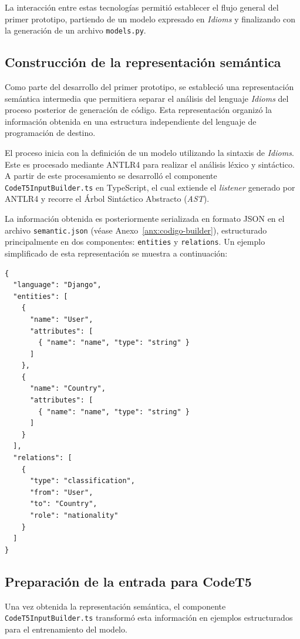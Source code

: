 La interacción entre estas tecnologías permitió establecer el flujo general del primer prototipo, partiendo de un modelo expresado en \textit{Idioms} y finalizando con la generación de un archivo \texttt{models.py}.

\subsection{Construcción de la representación semántica}
\label{subsec:p1-representacion-semantica}

Como parte del desarrollo del primer prototipo, se estableció una representación semántica intermedia que permitiera separar el análisis del lenguaje \textit{Idioms} del proceso posterior de generación de código. Esta representación organizó la información obtenida en una estructura independiente del lenguaje de programación de destino.

El proceso inicia con la definición de un modelo utilizando la sintaxis de \textit{Idioms}. Este es procesado mediante ANTLR4 para realizar el análisis léxico y sintáctico. A partir de este procesamiento se desarrolló el componente \texttt{CodeT5InputBuilder.ts} en TypeScript, el cual extiende el \textit{listener} generado por ANTLR4 y recorre el Árbol Sintáctico Abstracto (\textit{AST}).

La información obtenida es posteriormente serializada en formato JSON en el archivo \texttt{semantic.json} (véase Anexo~\ref{anx:codigo-builder}), estructurado principalmente en dos componentes: \texttt{entities} y \texttt{relations}. Un ejemplo simplificado de esta representación se muestra a continuación:

\begin{verbatim}
{
  "language": "Django",
  "entities": [
    {
      "name": "User",
      "attributes": [
        { "name": "name", "type": "string" }
      ]
    },
    {
      "name": "Country",
      "attributes": [
        { "name": "name", "type": "string" }
      ]
    }
  ],
  "relations": [
    {
      "type": "classification",
      "from": "User",
      "to": "Country",
      "role": "nationality"
    }
  ]
}
\end{verbatim}

\subsection{Preparación de la entrada para CodeT5}
\label{subsec:p1-preparacion-entrada}

Una vez obtenida la representación semántica, el componente \texttt{CodeT5InputBuilder.ts} transformó esta información en ejemplos estructurados para el entrenamiento del modelo.

